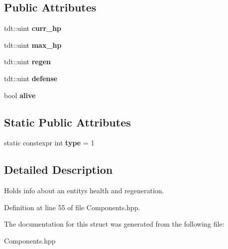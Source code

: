 \subsection*{Public Attributes}
\begin{DoxyCompactItemize}
\item 
tdt\+::uint {\bfseries curr\+\_\+hp}\hypertarget{struct_health_component_a2962b3338d598b1464984b4cf6c0e6ec}{}\label{struct_health_component_a2962b3338d598b1464984b4cf6c0e6ec}

\item 
tdt\+::uint {\bfseries max\+\_\+hp}\hypertarget{struct_health_component_af39f32766a319782781019905a204087}{}\label{struct_health_component_af39f32766a319782781019905a204087}

\item 
tdt\+::uint {\bfseries regen}\hypertarget{struct_health_component_ac064ede1ccfe8e917c190bafbaaf7a38}{}\label{struct_health_component_ac064ede1ccfe8e917c190bafbaaf7a38}

\item 
tdt\+::uint {\bfseries defense}\hypertarget{struct_health_component_a1fe173bfc3c6d95c1d7cb4acd6ecf016}{}\label{struct_health_component_a1fe173bfc3c6d95c1d7cb4acd6ecf016}

\item 
bool {\bfseries alive}\hypertarget{struct_health_component_a469e3ef8616f1563d234074b17bdbbc9}{}\label{struct_health_component_a469e3ef8616f1563d234074b17bdbbc9}

\end{DoxyCompactItemize}
\subsection*{Static Public Attributes}
\begin{DoxyCompactItemize}
\item 
static constexpr int {\bfseries type} = 1\hypertarget{struct_health_component_a06221c1e0f3a5e987f945c15e6ac15a6}{}\label{struct_health_component_a06221c1e0f3a5e987f945c15e6ac15a6}

\end{DoxyCompactItemize}


\subsection{Detailed Description}
Holds info about an entity\textquotesingle{}s health and regeneration. 

Definition at line 55 of file Components.\+hpp.



The documentation for this struct was generated from the following file\+:\begin{DoxyCompactItemize}
\item 
Components.\+hpp\end{DoxyCompactItemize}
